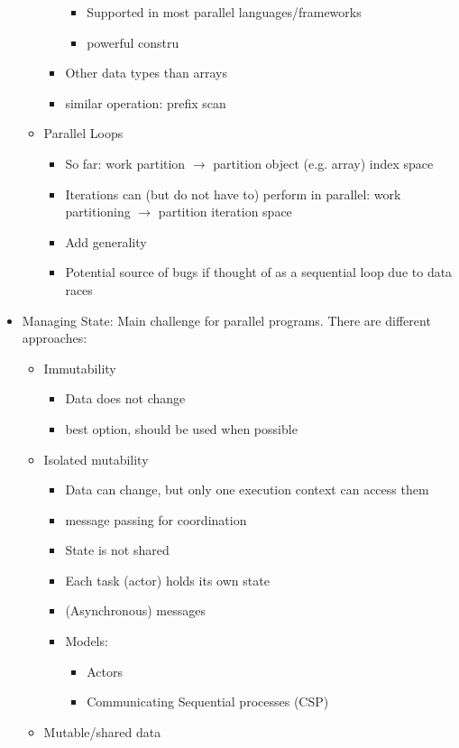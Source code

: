 \documentclass[a4paper]{article}
\begin{document}
\begin{itemize}
\begin{itemize}
\begin{itemize}
\begin{itemize}
\item Supported in most parallel languages/frameworks
\item powerful constru
\end{itemize}
\item Other data types than arrays
\item similar operation: prefix scan
\end{itemize}
\item Parallel Loops
\begin{itemize}
\item So far: work partition $\to$ partition object (e.g. array) index space
\item Iterations can (but do not have to) perform in parallel: work partitioning $\to$ partition iteration space
\item Add generality
\item Potential source of bugs if thought of as a sequential loop due to data races
\end{itemize}
\end{itemize}
\item Managing State: Main challenge for parallel programs. There are different approaches:
\begin{itemize}
\item Immutability
\begin{itemize}
\item Data does not change
\item best option, should be used when possible
\end{itemize}
\item Isolated mutability
\begin{itemize}
\item Data can change, but only one execution context can access them
\item message passing for coordination
\item State is not shared
\item Each task (actor) holds its own state
\item (Asynchronous) messages
\item Models:
\begin{itemize}
\item Actors
\item Communicating Sequential processes (CSP)
\end{itemize}
\end{itemize}
\item Mutable/shared data
\begin{itemize}

\end{itemize}
\end{itemize}
\end{itemize}
\end{document}
